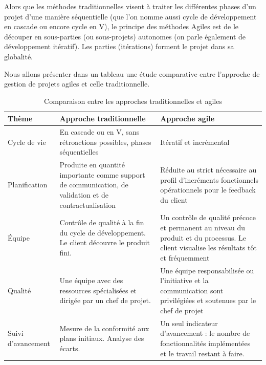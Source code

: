 Alors que les méthodes traditionnelles visent à traiter les différentes phases d’un projet d’une manière séquentielle (que l’on nomme aussi cycle de développement en cascade ou encore cycle
en V), le principe des méthodes Agiles est de le découper en sous-parties (ou sous-projets)
autonomes (on parle également de développement itératif). Les parties (itérations) forment le
projet dans sa globalité.

Nous allons présenter dans un tableau une étude comparative entre l’approche de gestion de projets agiles et celle traditionnelle.


\begin{table}[H]
	\centering
	\caption{Comparaison entre les approches traditionnelles et agiles}
	\label{tab:my-table}
	\begin{tabular}{|l|p{5cm}|p{6cm}|}
		\hline
		\textbf{Thème}      & \textbf{Approche traditionnelle}                                                                       & \textbf{Approche agile}                                                                                                                                              \\ \hline
		Cycle de vie        & En cascade ou en V, sans rétroactions possibles, phases séquentielles                                   & Itératif et incrémental                                                                                                                                              \\ \hline
		Planification       & Produite en quantité importante comme support de communication, de validation et de contractualisation & Réduite au strict nécessaire au profil d’incréments fonctionnels opérationnels pour le feedback du client                                                            \\ \hline
		Équipe              & Contrôle de qualité à la fin du cycle de développement. Le client découvre le produit fini.            & Un contrôle de qualité précoce et permanent au niveau du produit et du processus. Le client visualise les résultats tôt et fréquemment                               \\ \hline
		Qualité             & Une équipe avec des ressources spécialisées et dirigée par un chef de projet.                            & Une équipe responsabilisée ou l’initiative et la communication sont privilégiées et soutenues par le chef de projet                                                       \\ \hline
		Suivi d’avancement  & Mesure de la conformité aux plans initiaux. Analyse des écarts.                                        & Un seul indicateur d’avancement : le nombre de fonctionnalités implémentées et le travail restant à faire.                                                            \\ \hline

\end{tabular}
\end{table}
